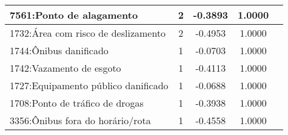 \begin{table}[htbp]
\begin{tabular}{|l|c|c|c|c|}
		\hline
		7561:Ponto de alagamento                              & 2                & -0.3893        & 1.0000           \\
		\hline
		1732:Área com risco de deslizamento                   & 2                & -0.4953        & 1.0000           \\
		\hline
		1744:Ônibus danificado                                & 1                & -0.0703        & 1.0000           \\
		\hline
		1742:Vazamento de esgoto                              & 1                & -0.4113        & 1.0000           \\
		\hline
		1727:Equipamento público danificado                   & 1                & -0.0688        & 1.0000           \\
		\hline
		1708:Ponto de tráfico de drogas                       & 1                & -0.3938        & 1.0000           \\
		\hline
		3356:Ônibus fora do horário/rota                      & 1                & -0.4558        & 1.0000           \\
		\hline
	\end{tabular}
\end{table}

